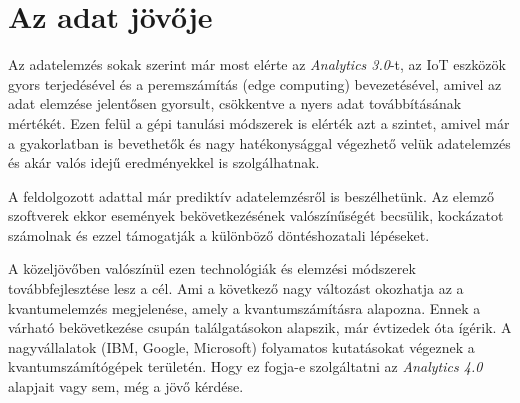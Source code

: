 \section{Az adat jövője}

Az adatelemzés sokak szerint már most elérte az \textit{Analytics 3.0}-t, az IoT eszközök gyors terjedésével és a peremszámítás (edge computing) bevezetésével, amivel az adat elemzése jelentősen gyorsult, csökkentve a nyers adat továbbításának mértékét. Ezen felül a gépi tanulási módszerek is elérték azt a szintet, amivel már a gyakorlatban is bevethetők és nagy hatékonysággal végezhető velük adatelemzés és akár valós idejű eredményekkel is szolgálhatnak.

A feldolgozott adattal már prediktív adatelemzésről is beszélhetünk. Az elemző szoftverek ekkor események bekövetkezésének valószínűségét becsülik, kockázatot számolnak és ezzel támogatják a különböző döntéshozatali lépéseket.

A közeljövőben valószínül ezen technológiák és elemzési módszerek továbbfejlesztése lesz a cél. Ami a következő nagy változást okozhatja az a kvantumelemzés megjelenése, amely a kvantumszámításra alapozna. Ennek a várható bekövetkezése csupán találgatásokon alapszik, már évtizedek óta ígérik. A nagyvállalatok (IBM, Google, Microsoft) folyamatos kutatásokat végeznek a kvantumszámítógépek területén. Hogy ez fogja-e szolgáltatni az \textit{Analytics 4.0} alapjait vagy sem, még a jövő kérdése.
